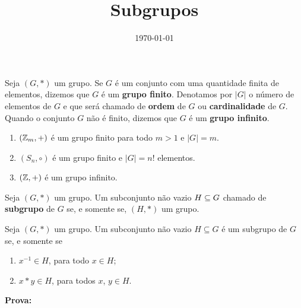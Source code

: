 \documentclass{beamer}
\title{Subgrupos}
\author[\autor]{\autor}
\institute[\instituto]{\instituto}
\date{\today}
\begin{document}
    \begin{frame}
        \maketitle
    \end{frame}


    \begin{frame}
        \begin{definicao}
            Seja $(G,*)$ um grupo. \pause Se $G$ {\'e} um conjunto com uma quantidade finita de elementos, \pause dizemos que $G$ {\'e} um \textbf{grupo finito}. \pause Denotamos por $|G|$ \pause o n{\'u}mero de elementos de $G$ \pause e que ser{\'a} chamado de \textbf{ordem} de $G$ \pause ou \textbf{cardinalidade} de $G$. \pause Quando o conjunto $G$ n{\~a}o {\'e} finito, \pause dizemos que $G$ {\'e} um \textbf{grupo infinito}.\pause
        \end{definicao}

        \begin{exemplos}
            \begin{enumerate}[label={\arabic*})]
                \item $(\mathbb{Z}_m, +)$ {\'e} um grupo finito para todo $m>1$ \pause e $|G| = m$.\pause
                \item $(S_n, \circ)$ \'e um grupo finito \pause e $|G| = n!$ elementos.\pause
                \item $(\mathbb{Z}, +)$ {\'e} um grupo infinito.
            \end{enumerate} 
        \end{exemplos}
    \end{frame}

    \begin{frame}
        \begin{definicao}
            Seja $(G,*)$ um grupo. \pause Um subconjunto n{\~a}o vazio \pause $H\subseteq G$  chamado de \textbf{subgrupo} de $G$ \pause se, e somente se, $(H,*)$  um grupo.\pause
        \end{definicao}

        \begin{proposicao}
            Seja $(G, *)$ um grupo. \pause Um subconjunto n{\~a}o vazio \pause $H\subseteq G$ {\'e} um subgrupo de $G$ \pause se, e somente se\pause
            \begin{enumerate}[label={\roman*})]
                \item\label{subgrupo_condicao_1} $x^{-1}\in H$, \pause para todo $x \in H$;
                \item\label{subgrupo_condicao_2} $x*y\in H$, \pause para todos $x$, $y \in H$.\pause
            \end{enumerate}
        \end{proposicao}
        \noindent \textbf{Prova:}
    \end{frame}
\end{document}
